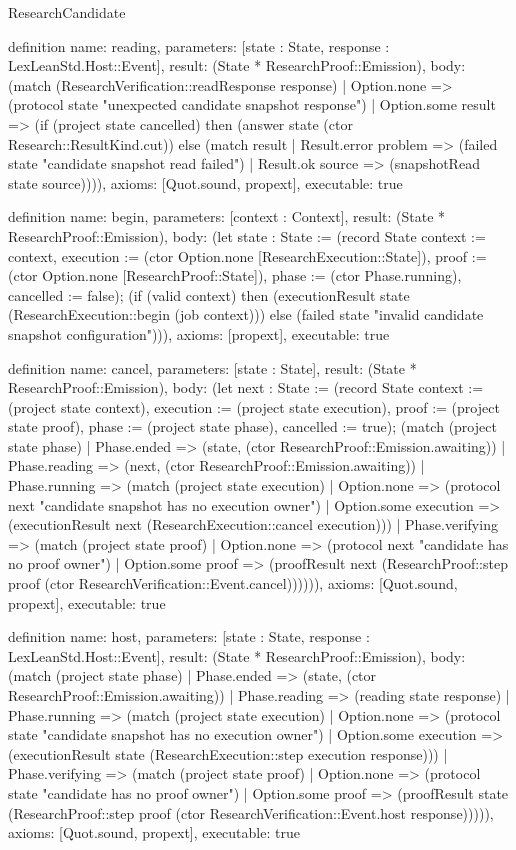 \begin{lexlean}{ResearchCandidate}
\begin{semanticmodule}
definition{
 name: reading,
 parameters: [state : State, response : LexLeanStd.Host::Event],
 result: (State * ResearchProof::Emission),
 body: (match (ResearchVerification::readResponse response) | Option.none => (protocol state "unexpected candidate snapshot response") | Option.some result => (if (project state cancelled) then (answer state (ctor Research::ResultKind.cut)) else (match result | Result.error problem => (failed state "candidate snapshot read failed") | Result.ok source => (snapshotRead state source)))),
 axioms: [Quot.sound, propext],
 executable: true
}

definition{
 name: begin,
 parameters: [context : Context],
 result: (State * ResearchProof::Emission),
 body: (let state : State := (record State {context := context, execution := (ctor Option.none [ResearchExecution::State]), proof := (ctor Option.none [ResearchProof::State]), phase := (ctor Phase.running), cancelled := false}); (if (valid context) then (executionResult state (ResearchExecution::begin (job context))) else (failed state "invalid candidate snapshot configuration"))),
 axioms: [propext],
 executable: true
}

definition{
 name: cancel,
 parameters: [state : State],
 result: (State * ResearchProof::Emission),
 body: (let next : State := (record State {context := (project state context), execution := (project state execution), proof := (project state proof), phase := (project state phase), cancelled := true}); (match (project state phase)
 | Phase.ended => (state, (ctor ResearchProof::Emission.awaiting))
 | Phase.reading => (next, (ctor ResearchProof::Emission.awaiting))
 | Phase.running => (match (project state execution) | Option.none => (protocol next "candidate snapshot has no execution owner") | Option.some execution => (executionResult next (ResearchExecution::cancel execution)))
 | Phase.verifying => (match (project state proof) | Option.none => (protocol next "candidate has no proof owner") | Option.some proof => (proofResult next (ResearchProof::step proof (ctor ResearchVerification::Event.cancel)))))),
 axioms: [Quot.sound, propext],
 executable: true
}

definition{
 name: host,
 parameters: [state : State, response : LexLeanStd.Host::Event],
 result: (State * ResearchProof::Emission),
 body: (match (project state phase)
 | Phase.ended => (state, (ctor ResearchProof::Emission.awaiting))
 | Phase.reading => (reading state response)
 | Phase.running => (match (project state execution) | Option.none => (protocol state "candidate snapshot has no execution owner") | Option.some execution => (executionResult state (ResearchExecution::step execution response)))
 | Phase.verifying => (match (project state proof) | Option.none => (protocol state "candidate has no proof owner") | Option.some proof => (proofResult state (ResearchProof::step proof (ctor ResearchVerification::Event.host response))))),
 axioms: [Quot.sound, propext],
 executable: true
}


\end{semanticmodule}
\end{lexlean}
